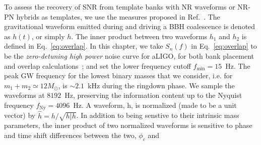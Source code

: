 To assess the recovery of SNR from template banks with NR waveforms or NR-PN 
hybrids as templates, we use the measures proposed in
Ref.~\cite{FittingFactorApostolatos,Sathyaprakash:1991mt,Balasubramanian:1995bm}. 
The gravitational waveform emitted during and driving a BBH coalescence is
denoted as $h(t)$, or simply $h$. The inner product between two 
waveforms $h_1$ and $h_2$ is defined in Eq.~\ref{eq:overlap}.
In this chapter, we take $S_n(f)$ in Eq.~\ref{eq:overlap}
to be the \textit{zero-detuning high power} 
noise curve for aLIGO, for both bank placement and overlap
calculations~\cite{aLIGONoiseCurve}; and set the lower frequency cutoff 
$f_\mathrm{min} =15$~Hz. The peak GW frequency for the lowest binary masses
that we consider, i.e. for $m_1+m_2\simeq 12M_\odot$, is $\sim 2.1$~kHz during
the ringdown phase. We sample the waveforms at $8192$~Hz, preserving the 
information content up to the Nyquist frequency $f_\mathrm{Ny}=4096$~Hz.
A waveform, h, is normalized (made to be a unit vector) by 
$\hat{h} = h/\sqrt{h | h}$. In addition to being senstive to their 
intrinsic mass parameters, the inner product of two normalized waveforms is 
sensitive to phase and time shift differences between the two, $\phi_{c}$ and
